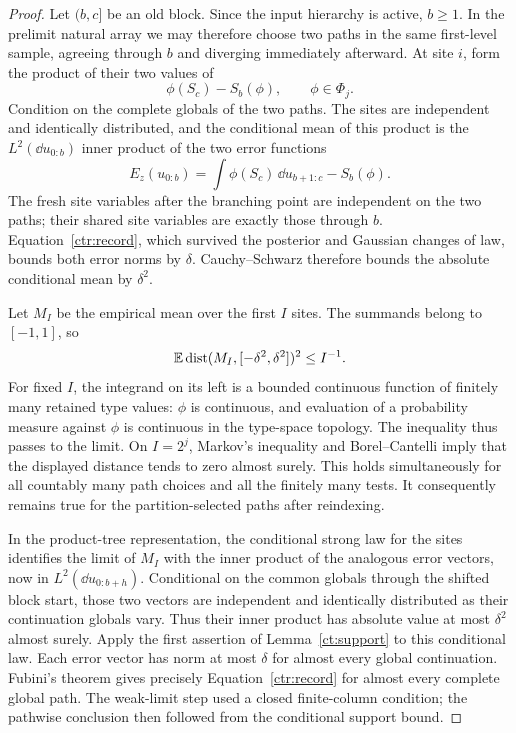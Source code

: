 \begin{proof}
Let $(b,c]$ be an old block.  Since the input hierarchy is active,
$b\ge1$.  In the prelimit natural array we may therefore choose
two paths in the same first-level sample, agreeing through $b$
and diverging immediately afterward.  At site $i$, form the
product of their two values of
\[
                              \phi(S_c)-S_b(\phi),
                         \qquad \phi\in\Phi_j.
\]
Condition on the complete globals of the two paths.  The sites
are independent and identically distributed, and the conditional
mean of this product is the $L^2(\dd u_{0:b})$ inner product of
the two error functions
\[
    E_z(u_{0:b})=
          \int\phi(S_c)\,\dd u_{b+1:c}-S_b(\phi).
\]
The fresh site variables after the branching point are independent
on the two paths; their shared site variables are exactly those
through $b$.  Equation~\eqref{ctr:record}, which survived the
posterior and Gaussian changes of law, bounds both error norms
by $\delta$.  Cauchy--Schwarz therefore bounds the absolute
conditional mean by $\delta^2$.

Let $M_I$ be the empirical mean over the first $I$ sites.  The
summands belong to $[-1,1]$, so
\begin{equation}\label{ct:old-empirical-bound}
     \mathbb E\operatorname{dist}(M_I,[-\delta^2,\delta^2])^2\le I^{-1}.
\end{equation}
For fixed $I$, the integrand on its left is a bounded continuous function of finitely
many retained type values: $\phi$ is continuous, and evaluation
of a probability measure against $\phi$ is continuous in the
type-space topology.  The inequality thus passes to the limit.
On $I=2^j$, Markov's inequality and Borel--Cantelli imply that
the displayed distance tends to zero almost surely.  This holds
simultaneously for all countably many path choices and all the
finitely many tests.  It consequently remains true for the
partition-selected paths after reindexing.

In the product-tree representation, the conditional strong law
for the sites identifies the limit of $M_I$ with the inner
product of the analogous error vectors, now in
$L^2(\dd u_{0:b+h})$.  Conditional on the common globals through
the shifted block start, those two vectors are independent and
identically distributed as their continuation globals vary.
Thus their inner product has absolute value at most $\delta^2$
almost surely.  Apply the first assertion of
Lemma~\ref{ct:support} to this conditional law.  Each error
vector has norm at most $\delta$ for almost every global
continuation.  Fubini's theorem gives precisely
Equation~\eqref{ctr:record} for almost every complete global
path.  The weak-limit step used a closed finite-column condition;
the pathwise conclusion then followed from the conditional support bound.
\end{proof}

